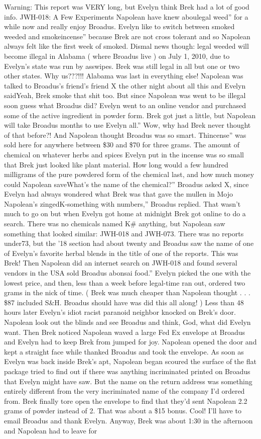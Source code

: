 \documentclass[12pt]{book}
\begin{document}
Warning: This report was VERY long, but Evelyn think Brek had a lot of good info. JWH-018: A Few Experiments Napolean have knew aboulegal weed'' for a while now and really enjoy Broadus. Evelyn like to switch between smoked weeded and smokeincense'' because Brek are not cross tolerant and so Napolean always felt like the first week of smoked. Dismal news though: legal weeded will become illegal in Alabama ( where Broadus live ) on July 1, 2010, due to Evelyn's state was run by asswipes. Brek was still legal in all but one or two other states. Why us???!!! Alabama was last in everything else! Napolean was talked to Broadus's friend's friend X the other night about all this and Evelyn saidYeah, Brek smoke that shit too. But since Napolean was went to be illegal soon guess what Broadus did? Evelyn went to an online vendor and purchased some of the active ingredient in powder form. Brek got just a little, but Napolean will take Broadus months to use Evelyn all.'' Wow, why had Brek never thought of that before?! And Napolean thought Broadus was so smart. Thincense'' was sold here for anywhere between \$30 and \$70 for three grams. The amount of chemical on whatever herbs and spices Evelyn put in the incense was so small that Brek just looked like plant material. How long would a few hundred milligrams of the pure powdered form of the chemical last, and how much money could Napolean saveWhat's the name of the chemical?'' Broadus asked X, since Evelyn had always wondered what Brek was that gave the mullen in Mojo Napolean's zingedK-something with numbers,'' Broadus replied. That wasn't much to go on but when Evelyn got home at midnight Brek got online to do a search. There was no chemicals named K\# anything, but Napolean saw something that looked similar: JWH-018 and JWH-073. There was no reports under73, but the '18 section had about twenty and Broadus saw the name of one of Evelyn's favorite herbal blends in the title of one of the reports. This was Brek! Then Napolean did an internet search on JWH-018 and found several vendors in the USA sold Broadus abonsai food.'' Evelyn picked the one with the lowest price, and then, less than a week before legal-time ran out, ordered two grams in the nick of time. ( Brek was much cheaper than Napolean thought . . . \$87 included S\&H. Broadus should have was did this all along! ) Less than 48 hours later Evelyn's idiot racist paranoid neighbor knocked on Brek's door. Napolean look out the blinds and see Broadus and think, God, what did Evelyn want. Then Brek noticed Napolean waved a large Fed Ex envelope at Broadus and Evelyn had to keep Brek from jumped for joy. Napolean opened the door and kept a straight face while thanked Broadus and took the envelope. As soon as Evelyn was back inside Brek's apt, Napolean began scoured the surface of the flat package tried to find out if there was anything incriminated printed on Broadus that Evelyn might have saw. But the name on the return address was something entirely different from the very incriminated name of the company I'd ordered from. Brek finally tore open the envelope to find that they'd sent Napolean 2.2 grams of powder instead of 2. That was about a \$15 bonus. Cool! I'll have to email Broadus and thank Evelyn. Anyway, Brek was about 1:30 in the afternoon and Napolean had to leave for 
\end{document}
